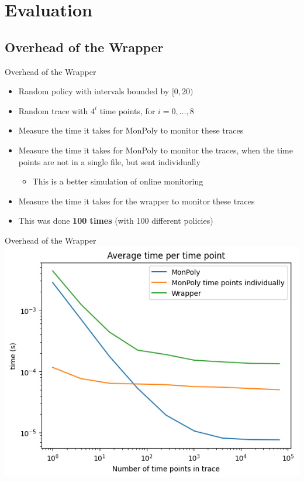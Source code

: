 \section{Evaluation}


\subsection{Overhead of the Wrapper}
\begin{frame}{Overhead of the Wrapper}
    \begin{itemize}
        \item Random policy with intervals bounded by $[0,20)$
        \item Random trace with $4^i$ time points, for $i = 0,\dots,8$
        \item Measure the time it takes for MonPoly to monitor these traces
        \item Measure the time it takes for MonPoly to monitor the traces, when the time points are not in a single file, but sent individually
        \begin{itemize}
            \item This is a better simulation of online monitoring
        \end{itemize}
        \item Measure the time it takes for the wrapper to monitor these traces
        \item This was done \textbf{100 times} (with 100 different policies)
    \end{itemize}
\end{frame}

\begin{frame}{Overhead of the Wrapper}
    \centering
    \includegraphics[width=0.9\linewidth]{diagrams/per-time-point-monpoly-vs-wrapper.png}
\end{frame}

